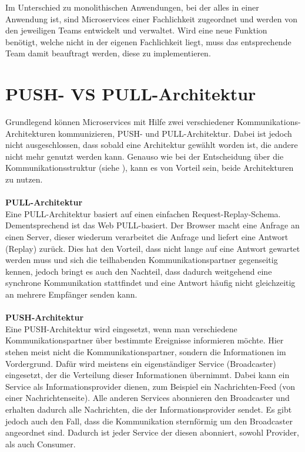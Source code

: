Im Unterschied zu monolithischen Anwendungen, bei der alles in einer Anwendung ist, sind Microservices einer Fachlichkeit zugeordnet und werden von den jeweiligen Teams entwickelt und verwaltet. Wird eine neue Funktion benötigt, welche nicht in der eigenen Fachlichkeit liegt, muss das entsprechende Team damit beauftragt werden, diese zu implementieren.

\section{PUSH- VS PULL-Architektur}
\label{sec:PushPullArchitektur}
Grundlegend können Microservices mit Hilfe zwei verschiedener Kommunikations-Architekturen kommunizieren, PUSH- und PULL-Architektur. Dabei ist jedoch nicht ausgeschlossen, dass sobald eine Architektur gewählt worden ist, die andere nicht mehr genutzt werden kann. Genauso wie bei der Entscheidung über die Kommunikationsstruktur (siehe ), kann es von Vorteil sein, beide Architekturen zu nutzen.
\\\\
\textbf{PULL-Architektur}\\
Eine PULL-Architektur basiert auf einen einfachen Request-Replay-Schema. Dementsprechend ist das Web PULL-basiert.
Der Browser macht eine Anfrage an einen Server, dieser wiederum verarbeitet die Anfrage und liefert eine Antwort (Replay) zurück. Dies hat den Vorteil, dass nicht lange auf eine Antwort gewartet werden muss und sich die teilhabenden Kommunikationspartner gegenseitig kennen, jedoch bringt es auch den Nachteil, dass dadurch weitgehend eine synchrone Kommunikation stattfindet und eine Antwort häufig nicht gleichzeitig an mehrere Empfänger senden kann.
\\\\
\textbf{PUSH-Architektur}\\
Eine PUSH-Architektur wird eingesetzt, wenn man verschiedene Kommunikationspartner über bestimmte Ereignisse informieren möchte. Hier stehen meist nicht die Kommunikationspartner, sondern die Informationen im Vordergrund. Dafür wird meistens ein eigenständiger Service (Broadcaster) eingesetzt, der die Verteilung dieser Informationen übernimmt. Dabei kann ein Service als Informationsprovider dienen, zum Beispiel ein Nachrichten-Feed (von einer Nachrichtenseite). Alle anderen Services abonnieren den Broadcaster und erhalten dadurch alle Nachrichten, die der Informationsprovider sendet.
Es gibt jedoch auch den Fall, dass die Kommunikation sternförmig um den Broadcaster angeordnet sind. Dadurch ist jeder Service der diesen abonniert, sowohl Provider, als auch Consumer.
